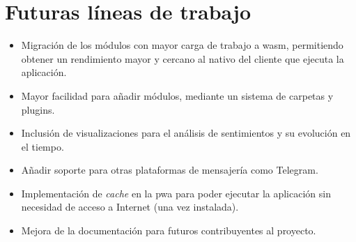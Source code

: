 \section{Futuras líneas de trabajo}
\label{sec:future-work}


\begin{itemize}

\item Migración de los módulos con mayor carga de trabajo a \acrfull{wasm}, permitiendo obtener un rendimiento mayor y cercano al nativo del cliente que ejecuta la aplicación.

\item Mayor facilidad para añadir módulos, mediante un sistema de carpetas y plugins.

\item Inclusión de visualizaciones para el análisis de sentimientos y su evolución en el tiempo.

\item Añadir soporte para otras plataformas de mensajería como Telegram.

\item Implementación de \textit{cache} en la \acrfull{pwa} para poder ejecutar la aplicación sin necesidad de acceso a Internet (una vez instalada).

\item Mejora de la documentación para futuros contribuyentes al proyecto.

\end{itemize}
